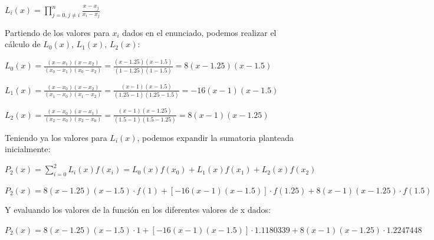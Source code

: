 \documentclass[english,notitlepage,letterpaper, 10pt]{article} %
\begin{document}
\begin{enumerate}
\begin{enumerate}
      \begin{center}
        \begin{math}
          L_i(x) = \displaystyle\prod_{j=0, j \not= i}^{n} \frac{x-x_j}{x_i - x_j}
        \end{math}
      \end{center}

      Partiendo de los valores para $x_i$ dados en el enunciado, podemos realizar el cálculo de $L_0(x)$, $L_1(x)$, $L_2(x)$:

      \begin{center}
        \begin{math}
          \displaystyle L_0(x) = \frac{(x-x_1)(x-x_2)}{(x_0-x_1)(x_0-x_2)} = \frac{(x-1.25)(x-1.5)}{(1-1.25)(1-1.5)} = 8(x-1.25)(x-1.5)
        \end{math} 

        \begin{math}
          \displaystyle L_1(x) = \frac{(x-x_0)(x-x_2)}{(x_1-x_0)(x_1-x_2)} = \frac{(x-1)(x-1.5)}{(1.25-1)(1.25-1.5)} = -16(x-1)(x-1.5)
        \end{math}

        \begin{math}
          \displaystyle L_2(x) = \frac{(x-x_0)(x-x_1)}{(x_2-x_0)(x_2-x_0)} = \frac{(x-1)(x-1.25)}{(1.5-1)(1.5-1.25)} = 8(x-1)(x-1.25)
        \end{math}
      \end{center}

      Teniendo ya los valores para $L_i(x)$, podemos expandir la sumatoria planteada inicialmente:

      \begin{center}

        \begin{math}
          P_2(x)  = \displaystyle\sum_{i=0}^2 L_i(x)f(x_i) = L_0(x) f(x_0) + L_1(x) f(x_1) + L_2(x) f(x_2) 
        \end{math}

        \begin{math}
          P_2(x) = 8(x-1.25)(x-1.5) \cdot f(1) + [-16(x-1)(x-1.5)] \cdot f(1.25) + 8(x-1)(x-1.25) \cdot f(1.5)
        \end{math}

      \end{center}

      Y evaluando los valores de la función en los diferentes valores de x dados:

      \begin{center}
        \begin{math}
          P_2(x) = 8(x-1.25)(x-1.5) \cdot 1 + [-16(x-1)(x-1.5)] \cdot 1.1180339 + 8(x-1)(x-1.25) \cdot 1.2247448
        \end{math}
      \end{center}


\end{enumerate}
\end{enumerate}
\end{document}
